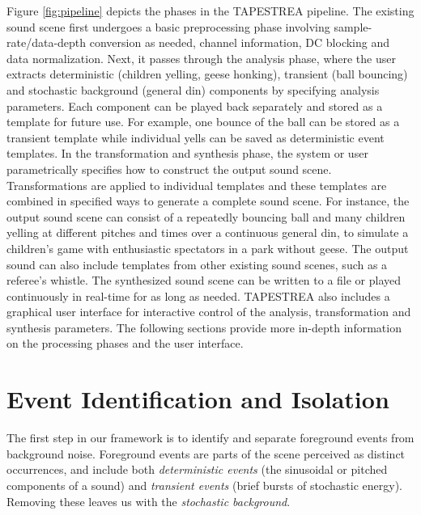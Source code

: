 \documentclass[twoside]{article}
\begin{document}
Figure \ref{fig:pipeline} depicts the phases in the TAPESTREA pipeline. The existing sound scene first
undergoes a basic preprocessing phase involving sample-rate/data-depth 
conversion as needed, channel information, DC blocking and data normalization. Next, it passes through the 
analysis phase, where the user extracts deterministic (children yelling, geese honking), 
transient (ball bouncing) and stochastic background (general din) 
components by specifying analysis parameters. Each component can be played back separately 
and stored as a template for future use. For example, one bounce of the ball can 
be stored as a transient template while individual yells can be saved as deterministic event 
templates. In the transformation and synthesis phase, the system or user parametrically specifies 
how to construct the output sound scene. Transformations are applied to individual 
templates and these templates are combined in specified ways to generate a complete sound scene. 
For instance, the output sound scene can consist of a repeatedly bouncing ball and many children yelling 
at different pitches and times over a continuous general din, to simulate a 
children's game with enthusiastic spectators in a park without geese. The output sound can also 
include templates from other existing sound scenes, such as a referee's whistle. The synthesized 
sound scene can be written to a file or played continuously in real-time 
for as long as needed. TAPESTREA also includes a graphical user interface for interactive control 
of the analysis, transformation and synthesis parameters. The following sections provide more in-depth 
information on the processing phases and the user interface. 

\section{Event Identification and Isolation}

The first step in our framework is to identify and separate foreground events from 
background noise. Foreground events are parts of the scene perceived as distinct occurrences, and 
include both \emph{deterministic events} (the 
sinusoidal or pitched components of a sound) and \emph{transient events} (brief bursts 
of stochastic energy). Removing these leaves us with the \emph{stochastic background}. 

\end{document}
